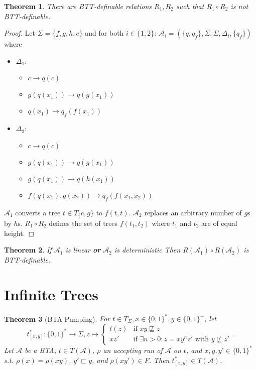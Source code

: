 \documentclass{article}
\newtheorem{theorem}{Theorem}[section]
\begin{document}
\begin{theorem}
	There are BTT-definable relations $R_1, R_2$ such that $R_1 \circ R_2$ is not BTT-definable.
\end{theorem}
\begin{proof}
	Let $\Sigma = \{f,g,h,c\}$ and for both $i \in \{1,2\}$: $\mathcal{A}_i = (\{q,q_f\}, \Sigma, \Sigma, \Delta_i, \{q_f\})$ where 
	\begin{itemize}
		\item $\Delta_1$:
		\begin{itemize}
			\item $c \rightarrow q(c)$
			\item $g(q(x_1)) \rightarrow q(g(x_1))$
			\item $q(x_1) \rightarrow q_f(f(x_1))$
		\end{itemize}
		\item $\Delta_2$:
		\begin{itemize}
			\item $c \rightarrow q(c)$
			\item $g(q(x_1)) \rightarrow q(g(x_1))$
			\item $g(q(x_1)) \rightarrow q(h(x_1))$
			\item $f(q(x_1), q(x_2)) \rightarrow q_f(f(x_1, x_2))$
		\end{itemize}
	\end{itemize}
	
	$\mathcal{A}_1$ converts a tree $t \in T_\{c,g\}$ to $f(t, t)$.
	$\mathcal{A}_2$ replaces an arbitrary number of $g$s by $h$s.
	$R_1 \circ R_2$ defines the set of trees $f(t_1, t_2)$ where $t_1$ and $t_2$ are of equal height.
\end{proof}

\begin{theorem}
	If $\mathcal{A}_1$ is linear \textbf{or} $\mathcal{A}_2$ is deterministic Then $R(\mathcal{A}_1) \circ R(\mathcal{A}_2)$ is BTT-definable.
\end{theorem}


\section{Infinite Trees}
\begin{theorem}[BTA Pumping]
	For $t \in T_\Sigma, x \in \{0,1\}^*, y \in \{0,1\}^+$, let 
	$$t^*_{[x,y]} : \{0,1\}^* \rightarrow \Sigma, z \mapsto \begin{cases} t(z) & \text{if } xy \not\sqsubseteq z \\ xz' & \text{if } \exists n>0: z = xy^nz' \text{ with } y \not\sqsubseteq z' \end{cases}.$$
	Let $\mathcal{A}$ be a BTA, $t \in T(\mathcal{A})$, $\rho$ an accepting run of $\mathcal{A}$ on $t$, and $x, y, y' \in \{0,1\}^*$ s.t. $\rho(x) = \rho(xy)$, $y' \sqsubset y$, and $\rho(xy') \in F$. Then $t^*_{[x,y]} \in T(\mathcal{A})$.
\end{theorem}
\end{document}

